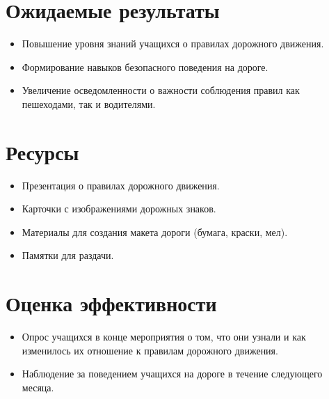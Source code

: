 \documentclass[a4paper,12pt]{article}
\begin{document}
\section*{Ожидаемые результаты}
\begin{itemize}
    \item Повышение уровня знаний учащихся о правилах дорожного движения.
    \item Формирование навыков безопасного поведения на дороге.
    \item Увеличение осведомленности о важности соблюдения правил как пешеходами, так и водителями.
\end{itemize}

\section*{Ресурсы}
\begin{itemize}
    \item Презентация о правилах дорожного движения.
    \item Карточки с изображениями дорожных знаков.
    \item Материалы для создания макета дороги (бумага, краски, мел).
    \item Памятки для раздачи.
\end{itemize}

\section*{Оценка эффективности}
\begin{itemize}
    \item Опрос учащихся в конце мероприятия о том, что они узнали и как изменилось их отношение к правилам дорожного движения.
    \item Наблюдение за поведением учащихся на дороге в течение следующего месяца.
\end{itemize}
\end{document}
